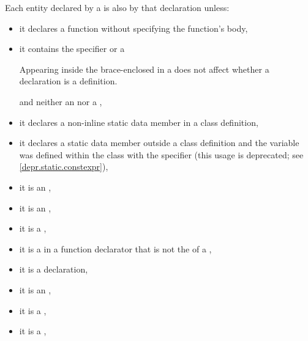 \pnum
{}%
%
Each entity declared by a  is
also  by that declaration unless:
\begin{itemize}
\item
it declares a function
without specifying the function's body,
\item
it contains
the
%
 specifier or a
\begin{footnote}
Appearing inside the brace-enclosed
 in a  does
not affect whether a declaration is a definition.
\end{footnote}
and neither an  nor a
,
\item
{}%
it declares a non-inline static data member in a class
definition,
\item
it declares a static data member outside a class definition
and the variable was defined within the class with the 
specifier (this usage is deprecated; see \ref{depr.static.constexpr}),
\item
{}%
it is an ,
\item
it is an
%
,
\item
it is a
%
,
\item
it is a
%
 in a function
%
declarator that is not the  of a
,
\item
it is a
%
 declaration,
\item it is
an ,
\item it is
a
,
\item it is
a ,

\end{itemize}
